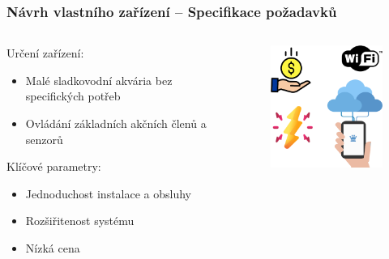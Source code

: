 \documentclass[%
  12pt,       				%
	t,                  %
	aspectratio=1610,   %
	unicode,						%
]{beamer}				    	%
\begin{document}
\begin{frame}[fragile]
\begin{columns}[T]
\begin{column}{0.5\textwidth}
\begin{figure}
			\end{figure}
		\end{column}
	\end{columns}											%
\end{frame}


\begin{frame}[fragile]
	\frametitle{Návrh vlastního zařízení -- Specifikace požadavků}
	
	\begin{columns}[T] 								%
		\begin{column}{0.8\textwidth}		%
			Určení zařízení:\\[1ex]
			\begin{itemize}
				\item Malé sladkovodní akvária bez specifických potřeb
				\item Ovládání základních akčních členů a senzorů
			\end{itemize}
			\vspace{1.5ex}%
			Klíčové parametry:\\[1ex]
			\begin{itemize}
				\item Jednoduchost instalace a obsluhy
				\item Rozšiřitenost systému
				\item Nízká cena
			\end{itemize}
		\end{column}
		\begin{column}{0.2\textwidth}		%
			\begin{figure}%
				\centering
				\vspace{2cm}	              %
				\hspace{-4cm}
				\includegraphics[width=5cm]{obrazky/prezentace/icons.png}
			\end{figure}
		\end{column}
	\end{columns}	%
\end{frame}
\end{document}
